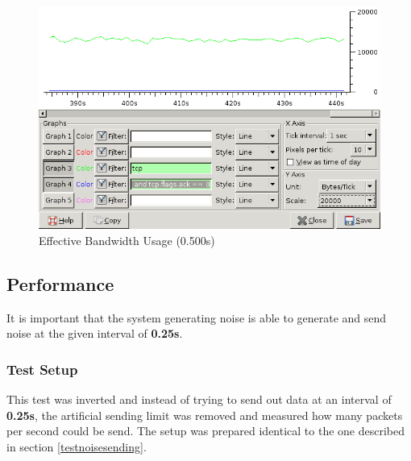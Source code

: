 \begin{figure}[htbp]
\caption{Effective Bandwidth Usage (0.500s)}
\label{bw0500}
\centering
\includegraphics[scale=0.5]{bandwidth-0500.png}
\end{figure}
\subsection{Performance}
It is important that the system generating noise is able to generate 
and send noise at the given interval of \textbf{0.25s}.
\subsubsection{Test Setup}
This test was inverted and instead of trying to send out data
at an interval of \textbf{0.25s}, the artificial sending limit was removed
and measured how many packets per second could be send.
The setup was prepared identical to the one described
in section \ref{testnoisesending}. 
